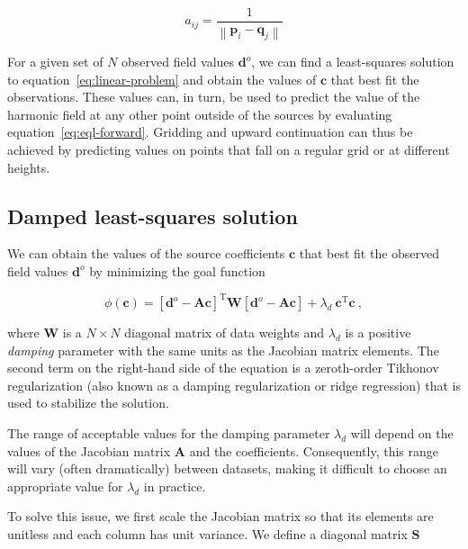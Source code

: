 \documentclass[twocolumn]{article}
\newcommand{\trans}{^{\text{T}}}
\begin{document}
\begin{equation}
    a_{ij} = \frac{1}{\left\lVert\mathbf{p}_i - \mathbf{q}_j\right\rVert}
\end{equation}

For a given set of $N$ observed field values $\mathbf{d}^o$,
we can find a least-squares solution to
equation~\ref{eq:linear-problem} and obtain the values of
$\mathbf{c}$ that best fit the observations.
These values can, in turn, be used to predict the value of the harmonic field
at any other point outside of the sources by evaluating
equation~\ref{eq:eql-forward}.
Gridding and upward continuation can thus be achieved by predicting values on
points that fall on a regular grid or at different heights.


\subsection{Damped least-squares solution}
\label{sec:eql_inversion}

We can obtain the values of the source coefficients $\mathbf{c}$ that best
fit the observed field values $\mathbf{d}^o$ by minimizing the goal function

\begin{equation}
    \phi(\mathbf{c}) =
    \left[\mathbf{d}^o - \mathbf{A}\mathbf{c}\right]\trans
    \mathbf{W}
    \left[\mathbf{d}^o - \mathbf{A}\mathbf{c}\right]
    + \lambda_d\ \mathbf{c}\trans\mathbf{c}
    \ ,
    \label{eq:misfit-unscaled}
\end{equation}

\noindent where
$\mathbf{W}$ is a $N \times N$ diagonal matrix of data weights and
$\lambda_d$ is a positive \emph{damping} parameter with the same units as the
Jacobian matrix elements.
The second term on the right-hand side of the equation is a zeroth-order
Tikhonov regularization \citep{tikhonov1977} (also known as a damping
regularization or ridge regression) that is used to stabilize the solution.

The range of acceptable values for the damping parameter $\lambda_d$ will
depend on the values of the Jacobian matrix $\mathbf{A}$ and the coefficients.
Consequently, this range will vary (often dramatically) between datasets,
making it difficult to choose an appropriate value for $\lambda_d$ in practice.

To solve this issue, we first scale the Jacobian matrix so that its elements
are unitless and each column has unit variance.
We define a diagonal matrix $\mathbf{S}$
\end{document}
